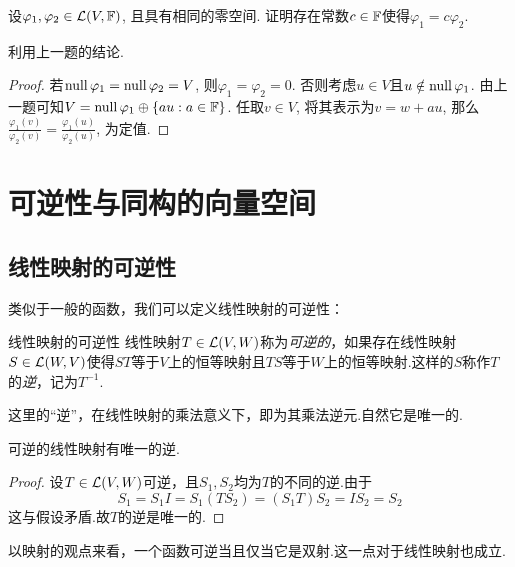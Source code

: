 \begin{exercise} %
	设$\varphi _1,\varphi _2 \in \mathcal{L} (V,\mathbb{F})$, 且具有相同的零空间. 证明存在常数$c \in \mathbb{F}$使得$\varphi _1 = c\varphi _2$. 
\end{exercise}
\begin{hint}
	利用上一题的结论. 
\end{hint}
\begin{proof}
	若$\operatorname{null} \varphi _1=\operatorname{null} \varphi _2=V$, 则$\varphi _1 = \varphi _2=0$. 否则考虑$u\in V$且$u \notin \operatorname{null} \varphi _1$. 由上一题可知$V = \operatorname{null} \varphi _1 \oplus \{ au:a \in \mathbb{F} \}$. 任取$v \in V$, 将其表示为$v = w + au$, 那么$\frac{\varphi _1(v)}{\varphi _2(v)} = \frac{\varphi _1(u)}{\varphi _2(u)}$, 为定值. 
\end{proof}

\section{可逆性与同构的向量空间}

\subsection{线性映射的可逆性}

类似于一般的函数，我们可以定义线性映射的可逆性：

\begin{definition}{线性映射的可逆性}
	线性映射$T \in \mathcal{L} (V,W)$称为\textit{可逆的}，如果存在线性映射$S \in \mathcal{L} (W,V)$使得$ST$等于$V$上的恒等映射且$TS$等于$W$上的恒等映射.这样的$S$称作$T$的\textit{逆}，记为$T^{-1}$.
\end{definition}

这里的“逆”，在线性映射的乘法意义下，即为其乘法逆元.自然它是唯一的.

\begin{proposition}{}
	可逆的线性映射有唯一的逆.
\end{proposition}
\begin{proof}
	设$T \in \mathcal{L} (V,W)$可逆，且$S_1,S_2$均为$T$的不同的逆.由于$$S_1 = S_1I = S_1(TS_2) = (S_1T)S_2 = IS_2 = S_2$$
	这与假设矛盾.故$T$的逆是唯一的.
\end{proof}

以映射的观点来看，一个函数可逆当且仅当它是双射.这一点对于线性映射也成立.

